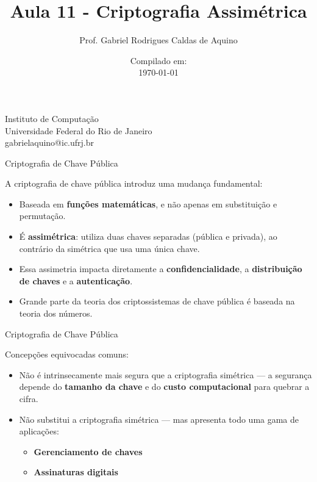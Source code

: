 \title{Aula 11 - Criptografia Assimétrica}

\author{Prof. Gabriel Rodrigues Caldas de Aquino}

\institute
{
  Instituto de Computação \\
  Universidade Federal do Rio de Janeiro\\
  gabrielaquino@ic.ufrj.br%
}
\date{Compilado em: \\ \today} %




\begin{frame}
  \titlepage
\end{frame}

\begin{frame}{Criptografia de Chave Pública}

  A criptografia de chave pública introduz uma mudança fundamental:
  \begin{itemize}
    \item Baseada em \textbf{funções matemáticas}, e não apenas em substituição e permutação.
    \item É \textbf{assimétrica}: utiliza duas chaves separadas (pública e privada), ao contrário da simétrica que usa uma única chave.
    \item Essa assimetria impacta diretamente a \textbf{confidencialidade}, a \textbf{distribuição de chaves} e a \textbf{autenticação}.
    \item Grande parte da teoria dos criptossistemas de chave pública é baseada na teoria dos números.
  \end{itemize}
\end{frame}
\begin{frame}{Criptografia de Chave Pública}

  Concepções equivocadas comuns:
  \begin{itemize}
    \item Não é intrinsecamente mais segura que a criptografia simétrica — a segurança depende do \textbf{tamanho da chave} e do \textbf{custo computacional} para quebrar a cifra.
    \item Não substitui a criptografia simétrica — mas apresenta todo uma gama de aplicações:
          \begin{itemize}
            \item \textbf{Gerenciamento de chaves}
            \item \textbf{Assinaturas digitais}
          \end{itemize}
  \end{itemize}
\end{frame}


